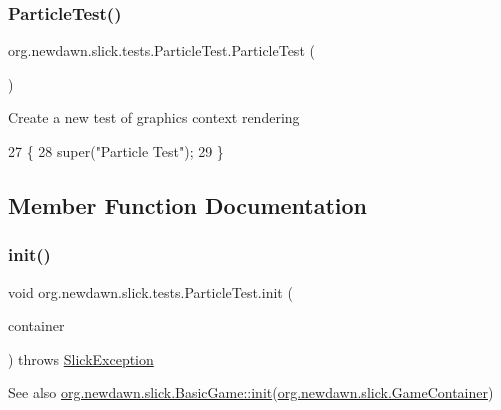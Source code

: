 \subsubsection{\texorpdfstring{Particle\+Test()}{ParticleTest()}}
{\footnotesize\ttfamily org.\+newdawn.\+slick.\+tests.\+Particle\+Test.\+Particle\+Test (\begin{DoxyParamCaption}{ }\end{DoxyParamCaption})\hspace{0.3cm}{\ttfamily [inline]}}

Create a new test of graphics context rendering 
\begin{DoxyCode}
27                           \{
28         super(\textcolor{stringliteral}{"Particle Test"});
29     \}
\end{DoxyCode}


\subsection{Member Function Documentation}
\mbox{\label{classorg_1_1newdawn_1_1slick_1_1tests_1_1_particle_test_aad28d636e7e9b2b314d70282b1aef649}} 
\subsubsection{\texorpdfstring{init()}{init()}}
{\footnotesize\ttfamily void org.\+newdawn.\+slick.\+tests.\+Particle\+Test.\+init (\begin{DoxyParamCaption}\item[{\mbox{\hyperlink{classorg_1_1newdawn_1_1slick_1_1_game_container}{Game\+Container}}}]{container }\end{DoxyParamCaption}) throws \mbox{\hyperlink{classorg_1_1newdawn_1_1slick_1_1_slick_exception}{Slick\+Exception}}\hspace{0.3cm}{\ttfamily [inline]}}

\begin{DoxySeeAlso}{See also}
\mbox{\hyperlink{classorg_1_1newdawn_1_1slick_1_1_basic_game_a8af0900217e4d389249f71367b22d114}{org.\+newdawn.\+slick.\+Basic\+Game\+::init}}(\mbox{\hyperlink{classorg_1_1newdawn_1_1slick_1_1_game_container}{org.\+newdawn.\+slick.\+Game\+Container}}) 
\end{DoxySeeAlso}


